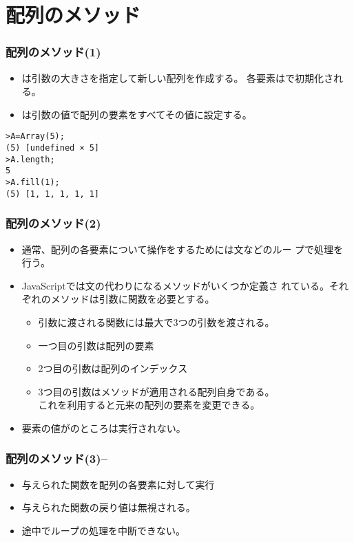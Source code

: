 

\frame{\maketitle}
\section{配列のメソッド}
\begin{frame}[containsverbatim]
 \frametitle{配列のメソッド(1)}
 \begin{itemize}
	\item {}は引数の大きさを指定して新しい配列を作成する。
				各要素はで初期化される。
	\item {}は引数の値で配列の要素をすべてその値に設定する。
 \end{itemize}
\begin{Verbatim}
>A=Array(5);
(5) [undefined × 5]
>A.length;
5
>A.fill(1);
(5) [1, 1, 1, 1, 1]
\end{Verbatim}
\end{frame}
\begin{frame}[containsverbatim]
 \frametitle{配列のメソッド(2)}
\begin{itemize}
 \item 通常、配列の各要素について操作をするためには文などのルー
 プで処理を行う。
 \item JavaScriptでは文の代わりになるメソッドがいくつか定義さ
       れている。それぞれのメソッドは引数に関数を必要とする。
       \begin{itemize}
        \item 引数に渡される関数には最大で3つの引数を渡される。
        \item 一つ目の引数は配列の要素
        \item 2つ目の引数は配列のインデックス
        \item 3つ目の引数はメソッドが適用される配列自身である。\\
              これを利用すると元来の配列の要素を変更できる。
       \end{itemize}
 \item 要素の値がのところは実行されない。
\end{itemize}
\end{frame}
\begin{frame}[containsverbatim]
 \frametitle{配列のメソッド(3)--}
 \begin{itemize}
  \item 与えられた関数を配列の各要素に対して実行
  \item 与えられた関数の戻り値は無視される。
  \item 途中でループの処理を中断できない。
  \end{itemize}
\end{frame}
